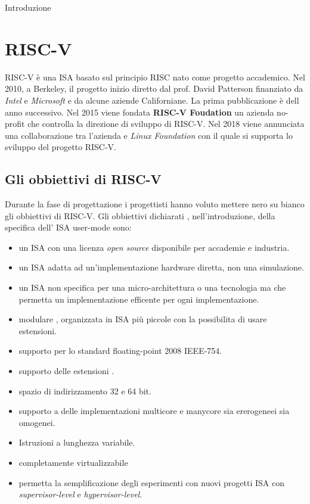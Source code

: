 \documentclass[12pt,a4paper]{report}
\begin{document}
Introduzione 




\tableofcontents
\listoffigures
\listoftables
\lstlistoflistings


\chapter{RISC-V}

RISC-V è una ISA basato sul principio RISC nato come progetto accademico.  Nel 2010, a Berkeley, il progetto inizio diretto dal prof. David Patterson finanziato da \textit{Intel} e \textit{Microsoft} e da alcune aziende Californiane. La prima pubblicazione è dell anno successivo. Nel 2015 viene fondata  \textbf{RISC-V Foudation} un azienda no-profit che controlla la direzione di sviluppo di RISC-V. Nel 2018 viene annunciata una collaborazione tra l'azienda e \textit{Linux Foundation} con il quale si supporta lo sviluppo del progetto RISC-V.



\section{Gli obbiettivi di RISC-V}
Durante la fase di progettazione i progettisti hanno voluto mettere nero su bianco gli obbiettivi di RISC-V. Gli obbiettivi dichiarati , nell'introduzione, della specifica dell' ISA user-mode sono:
\begin{itemize}
	\item un ISA con una licenza \textit{open source} disponibile per accademie e industria.
	\item un ISA adatta ad un’implementazione hardware diretta, non una simulazione.
	\item un ISA non specifica per una micro-architettura o una tecnologia ma che permetta un implementazione efficente per ogni implementazione.
	\item modulare , organizzata in ISA più piccole con la possibilita di usare estensioni.
	\item supporto per lo standard floating-point 2008 IEEE-754.
	\item supporto delle estensioni .
	\item spazio di indirizzamento 32 e 64 bit.
	\item supporto a delle implementazioni multicore e manycore sia ererogeneei sia omogenei.
	\item Istruzioni a lunghezza variabile.
	\item completamente virtualizzabile 
	\item permetta la semplificazione degli esperimenti con nuovi progetti ISA con \textit{supervisor-level} e \textit{hypervisor-level}. 
	
\end{itemize}
\end{document}
